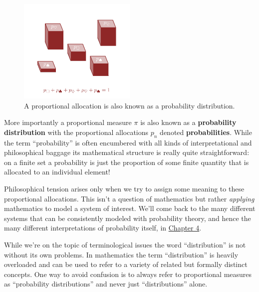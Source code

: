 \documentclass[
  letterpaper,
  DIV=11,
  numbers=noendperiod]{scrartcl}
\begin{document}
\begin{figure}

{\centering \includegraphics[width=0.5\textwidth,height=\textheight]{figures/probability_distribution/probability_distribution.pdf}

}

\caption{\label{fig-probability}A proportional allocation is also known
as a probability distribution.}

\end{figure}

More importantly a proportional measure \(\pi\) is also known as a
\textbf{probability distribution} with the proportional allocations
\(p_{n}\) denoted \textbf{probabilities}. While the term ``probability''
is often encumbered with all kinds of interpretational and philosophical
baggage its mathematical structure is really quite straightforward: on a
finite set a probability is just the proportion of some finite quantity
that is allocated to an individual element!

Philosophical tension arises only when we try to assign some meaning to
these proportional allocations. This isn't a question of mathematics but
rather \emph{applying} mathematics to model a system of interest. We'll
come back to the many different systems that can be consistently modeled
with probability theory, and hence the many different interpretations of
probability itself, in
\href{https://betanalpha.github.io/assets/chapters_html/probability_on_general_spaces.html}{Chapter
4}.

While we're on the topic of terminological issues the word
``distribution'' is not without its own problems. In mathematics the
term ``distribution'' is heavily overloaded and can be used to refer to
a variety of related but formally distinct concepts. One way to avoid
confusion is to always refer to proportional measures as ``probability
distributions'' and never just ``distributions'' alone.
\end{document}
